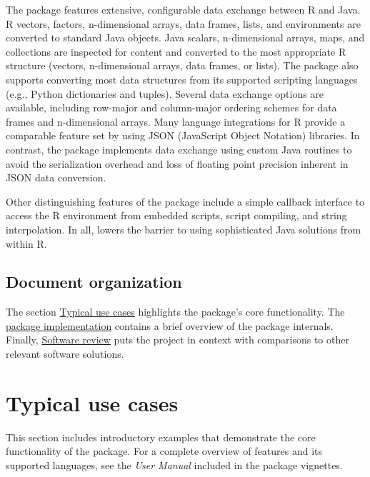 The  package features extensive, configurable data exchange between R and Java. R vectors, factors, n-dimensional arrays, data frames, lists, and environments are converted to standard Java objects. Java scalars, n-dimensional arrays, maps, and collections are inspected for content and converted to the most appropriate R structure (vectors, n-dimensional arrays, data frames, or lists). The  package also supports converting most data structures from its supported scripting languages (e.g., Python dictionaries and tuples). Several data exchange options are available, including row-major and column-major ordering schemes for data frames and n-dimensional arrays. Many language integrations for R provide a comparable feature set by using JSON (JavaScript Object Notation) libraries. In contrast, the  package implements data exchange using custom Java routines to avoid the serialization overhead and loss of floating point precision inherent in JSON data conversion.

Other distinguishing features of the  package include a simple callback interface to access the R environment from embedded scripts, script compiling, and string interpolation. In all,  lowers the barrier to using sophisticated Java solutions from within R.

\subsection{Document organization}

The section \hyperlink{typical-use-cases}{Typical use cases} highlights the  package's core functionality. The \hyperlink{the-jsr223-package-implementation}{ package implementation} contains a brief overview of the package internals. Finally,  \hyperlink{software-review}{Software review} puts the  project in context with comparisons to other relevant software solutions.

\hypertarget{typical-use-cases}{}
\section{Typical use cases}

This section includes introductory examples that demonstrate the core functionality of the  package. For a complete overview of  features and its supported languages, see the \textit{ User Manual} included in the package vignettes.

